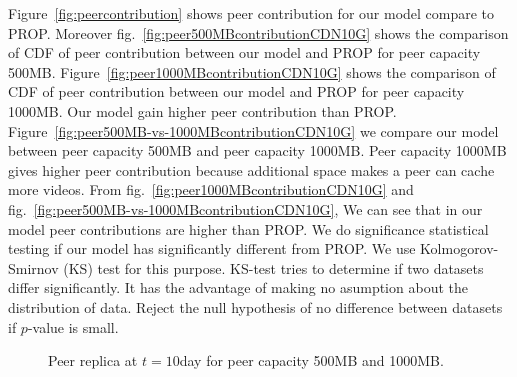 \documentclass[conference]{IEEEtran}
\begin{document}
Figure~\ref{fig:peercontribution} shows peer contribution for our model compare to PROP. 
Moreover fig.~\ref{fig:peer500MBcontributionCDN10G} shows the comparison of CDF of peer contribution between our model and PROP for peer capacity 500MB. 
Figure~\ref{fig:peer1000MBcontributionCDN10G} shows the comparison of CDF of peer contribution between our model and PROP for peer capacity 1000MB.
Our model gain higher peer contribution than PROP. 
Figure~\ref{fig:peer500MB-vs-1000MBcontributionCDN10G} we compare our model between peer capacity 500MB and peer capacity 1000MB.
Peer capacity 1000MB gives higher peer contribution because additional space makes a peer can cache more videos.
From fig.~\ref{fig:peer1000MBcontributionCDN10G} and fig.~\ref{fig:peer500MB-vs-1000MBcontributionCDN10G}, We can see that in our model peer contributions are higher than PROP.
We do significance statistical testing if our model has significantly different from PROP.
We use Kolmogorov-Smirnov (KS) test for this purpose.  
KS-test tries to determine if two datasets differ significantly.  
It has the advantage of making no asumption about the distribution of data. 
Reject the null hypothesis of no difference between datasets if $p$-value is small.


\begin{figure}[!htb]
\centering
{}
\hfill
{}
\caption{Peer replica at $t=10$day for peer capacity 500MB and 1000MB.}
\label{fig:replicaat10day}
\vspace{-2mm}
\end{figure}
\end{document}

